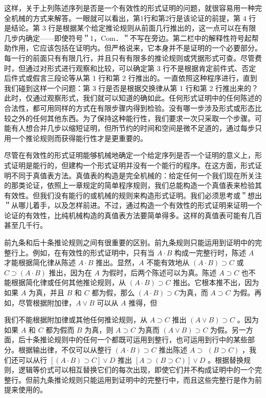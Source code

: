 这样，关于上列陈述序列是否是一个有效性的形式证明的问题，就很容易用一种完全机械的方式来解答。一眼就可以看出，第1行和第2行是该论证的前提，第 4 行是结论。第 3 行是根据某个给定推论规则从前面几行推出的，这一点可以在有限几步内确定——即使符号＂1，Com．＂不写在旁边。第二栏中的解释性符号起帮助作用，它应该包括在证明内。但严格说来，它本身并不是证明的一个必要部分。每一行的前面只有有限几行，并且只有有限多的推论规则或凭据形式可查。尽管费时，但通过对形式进行观察和比较，可以确定第 3 行不是根据肯定前件式、否定后件式或假言三段论等从第 1 行和第 2 行推出的。一直依照这种程序进行，直到我们碰到这样一个问题：第 3 行是否是根据交换律从第 1 行和第 2 行推出来的？此时，仅通过观察形式，我们就可以知道的确如此。任何形式证明中的任何陈述的合法性，都可用同样的方式在有限步骤内得到检验。没有哪一步涉及形式或形态比较之外的任何其他东西。为了保持这种能行性，我们要求一次只采取一个步骤。可能有人想合并几步以缩短证明，但所节约的时间和空间是微不足道的，通过每步只用一个推论规则而获得能行性才是更重要的。

尽管在有效性的形式证明能够机械地确定一个给定序列是否一个证明的意义上，形式证明是能行的，但建构一个形式证明并没有一个能行的程序。在这方面，形式证明不同于真值表方法。真值表的构造是完全机械的：给定任何一个我们现在所关注的那类论证，依照上一章规定的简单程序规则，我们总能构造一个真值表来检验其有效性。但我们没有能行的或机械的规则来构造形式证明。我们必须思考或＂想出＂从哪儿着手，以及怎样前进。不过，通过构造一个有效性的形式证明来证明一个论证的有效性，比纯机械构造的真值表方法要简单得多。这样的真值表可能有几百甚至几千行。

前九条和后十条推论规则之间有很重要的区别。前九条规则只能运用到证明中的完整行上。例如，在有效性的形式证明中，只有当 $A \cdot B$ 构成一完整行时，陈述 $A$ 才能根据简化律从陈述 $A \cdot B$ 推出。显然，$A$ 不能有效地从 $(A \cdot B) \supset C$ 或 $C \supset(A \cdot B)$ 推出，因为在 $A$ 为假时，后两个陈述可以为真。陈述 $A \supset C$ 也不能根据简化律或任何其他推论规则，从 $(A \cdot B) \supset C$ 推出。它根本推不出，因为如果 $A$ 为真，并且 $B$ 和 $C$ 都为假，那么 $(A \cdot B) \supset C$为真，而 $A \supset C$ 为假。再如，尽管根据附加律，$A \vee B$ 可以从 $A$ 推得，但

我们不能根据附加律或其他任何推论规则，从 $A \supset C$ 推出 $(A \vee B) \supset C$ 。因为如果 $A$ 和 $C$ 都为假而 $B$ 为真，则 $A \supset C$ 为真而 $(A \vee B) \supset C$ 为假。另一方面，后十条推论规则中的任何一个都既可运用到整行，也可运用到行中的某些部分。根据输出律，不仅可以从整行 $(A \cdot B) \supset C$ 推出陈述 $A \supset$ $(B \supset C)$ ，我们还可以从行 $[(A \cdot B) \supset C] \vee D$ 推出 $[A \supset(B \supset C)] \vee D$ 。根据替换规则，逻辑等价式可以相互替换它们的每次出现，即使它们并不构成证明中的一个完整行。但前九条推论规则只能运用到证明中的完整行中，而且这些完整行是作为前提来使用的。

